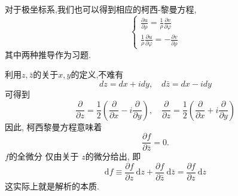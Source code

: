 对于极坐标系,我们也可以得到相应的柯西-黎曼方程,
\begin{equation}
    \left\{\begin{array}{l}
    \frac{\partial u}{\partial \rho}=\frac{1}{\rho} \frac{\partial v}{\partial \varphi} \\
    \frac{1}{\rho} \frac{\partial u}{\partial \varphi}=-\frac{\partial v}{\partial \rho}
    \end{array}\right.
    \end{equation}
其中两种推导作为习题.

利用$z,\bar{z}$的关于$x,y$的定义,不难有
\begin{equation}
    d z=d x+i d y, \quad d \bar{z}=d x-i d y
\end{equation}
可得到
\begin{equation}
    \frac{\partial}{\partial z}=\frac{1}{2}\left(\frac{\partial}{\partial x}-i \frac{\partial}{\partial y}\right), \quad \frac{\partial}{\partial z}=\frac{1}{2}\left(\frac{\partial}{\partial x}+i \frac{\partial}{\partial y}\right)
\end{equation}
因此, 柯西黎曼方程意味着
\begin{equation}
    \frac{\partial f}{\partial \bar{z}}=0.
\end{equation}
$f$的全微分 仅由关于 $z$的微分给出, 即
\begin{equation}
\mathrm{d}f \equiv \frac{\partial f}{\partial z} \mathrm{~d} z+\frac{\partial f}{\partial \bar{z}} \mathrm{~d} \bar{z}=\frac{\partial f}{\partial z} \mathrm{~d} z
\end{equation}
这实际上就是解析的本质.

